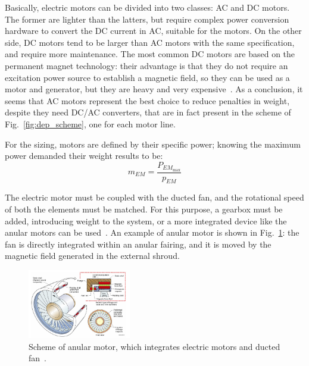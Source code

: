 Basically, electric motors can be divided into two classes: AC and DC motors.
The former are lighter than the latters, but require complex power conversion hardware to convert the DC current in AC, suitable for the motors. 
On the other side, DC motors tend to be larger than AC motors with the same specification, and require more maintenance. 
The most common DC motors are based on the permanent magnet technology: their advantage is that they do not require an excitation power source to establish a magnetic field, so they can be used as a motor and generator, but they are heavy and very expensive~\cite{bib:campbell}.
As a conclusion, it seems that AC motors represent the best choice to reduce penalties in weight, despite they need DC/AC converters, that are in fact present in the scheme of Fig.~\ref{fig:dep_scheme}, one for each motor line. 

For the sizing, motors are defined by their specific power; knowing the maximum power demanded their weight results to be:
\begin{equation}
	\label{eq:motor_weight}
	m_{EM} = \frac{P_{EM_{\max}}}{p_{EM}}
\end{equation}

The electric motor must be coupled with the ducted fan, and the rotational speed of both the elements must be matched. 
For this purpose, a gearbox must be added, introducing weight to the system, or a more integrated device like the anular motors can be used~\cite{bib:eichenber}. 
An example of anular motor is shown in Fig.~\ref{fig:anular_motor}: the fan is directly integrated within an anular fairing, and it is moved by the magnetic field generated in the external shroud. 
\begin{figure}[!h]
	\centering
	\includegraphics[keepaspectratio, width=0.4\textwidth]{images/chap3/anular_motor.jpg}
	\caption{Scheme of anular motor, which integrates electric motors and ducted fan~\cite{bib:eichenber}.}
	\label{fig:anular_motor}
\end{figure}


